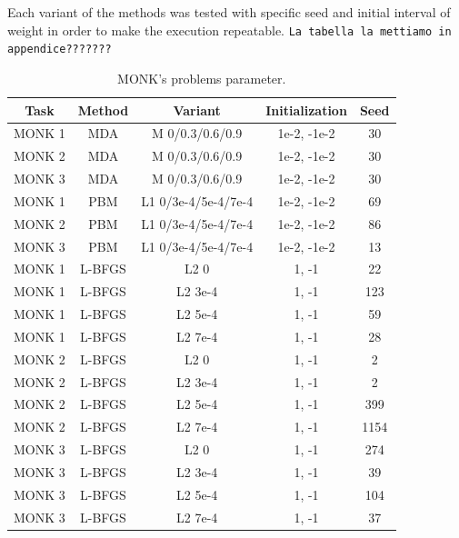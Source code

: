 Each variant of the methods was tested with specific seed and initial interval of weight in order to make the execution repeatable. 
\texttt{La tabella la mettiamo in appendice???????}
	\begin{table}[H]
		\centering
		\begin{tabular}{|c|c|c|c|c|}
			\hline
			\textbf{Task} &	\textbf{Method} &\textbf{ Variant} & \textbf{Initialization} &\textbf{Seed} \\ \hline
			MONK 1        &    MDA & M  0/0.3/0.6/0.9 & 1e-2, -1e-2 & 30  \\ \hline
			MONK 2        &    MDA & M  0/0.3/0.6/0.9 & 1e-2, -1e-2 & 30  \\ \hline
			MONK 3        &    MDA & M  0/0.3/0.6/0.9 & 1e-2, -1e-2 & 30  \\ \hline			
			MONK 1        &    PBM & L1  0/3e-4/5e-4/7e-4 & 1e-2, -1e-2 & 69  \\ \hline
			MONK 2        &    PBM & L1  0/3e-4/5e-4/7e-4 & 1e-2, -1e-2 & 86  \\ \hline
			MONK 3        &    PBM & L1  0/3e-4/5e-4/7e-4 & 1e-2, -1e-2 & 13  \\ \hline			
			MONK 1        &    L-BFGS & L2  0 & 1, -1 & 22  \\ \hline
			MONK 1        &    L-BFGS & L2  3e-4 & 1, -1 & 123  \\ \hline
			MONK 1        &    L-BFGS & L2  5e-4 & 1, -1 & 59  \\ \hline
			MONK 1        &    L-BFGS & L2  7e-4 & 1, -1 & 28  \\ \hline
			MONK 2        &    L-BFGS & L2  0 & 1, -1 & 2  \\ \hline
			MONK 2        &    L-BFGS & L2  3e-4 & 1, -1 & 2  \\ \hline
			MONK 2        &    L-BFGS & L2  5e-4 & 1, -1 & 399  \\ \hline
			MONK 2        &    L-BFGS & L2  7e-4 & 1, -1 & 1154  \\ \hline
			MONK 3        &    L-BFGS & L2  0 & 1, -1 & 274  \\ \hline
			MONK 3        &    L-BFGS & L2  3e-4 & 1, -1 & 39  \\ \hline
			MONK 3        &    L-BFGS & L2  5e-4 & 1, -1 & 104  \\ \hline
			MONK 3        &    L-BFGS & L2  7e-4 & 1, -1 & 37  \\ \hline
		\end{tabular}
		\caption{MONK's problems parameter.}
		\label{tab:dati}
	\end{table}
